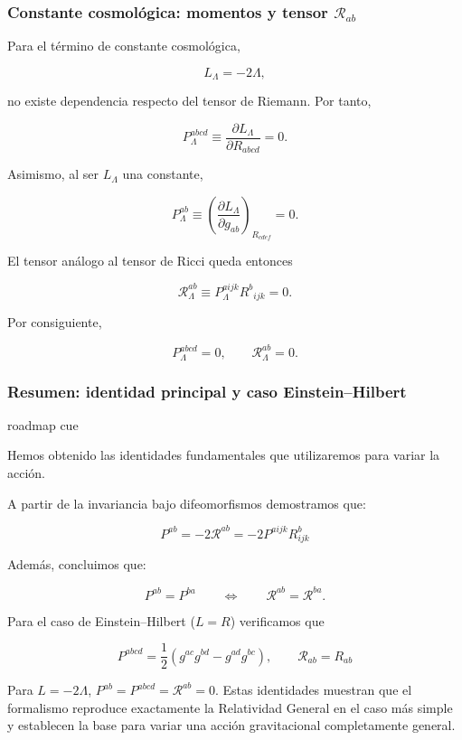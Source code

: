 \documentclass{beamer}
\newcommand{\CompactDisplaySpacing}{%
  \setlength{\abovedisplayskip}{2pt plus 1pt minus 1pt}%
  \setlength{\belowdisplayskip}{2pt plus 1pt minus 1pt}%
  \setlength{\abovedisplayshortskip}{0pt plus 1pt}%
  \setlength{\belowdisplayshortskip}{1pt plus 1pt}%
}
\newcommand{\RoadmapCue}[1]{%
    \begin{beamercolorbox}[
        wd=\textwidth,
        sep=.55ex,
        leftskip=.8ex,
        rounded=true
    ]{roadmap cue}

    \scriptsize
    \enspace #1

    \end{beamercolorbox}

    \vspace{.25em}
}
\begin{document}
\begin{frame}[label=nav-frame-021]
\frametitle{Constante cosmológica: momentos y tensor $\mathcal{R}_{ab}$}
\small
\linespread{.96}\selectfont\CompactDisplaySpacing

Para el término de constante cosmológica,

\[
L_{\Lambda}=-2\Lambda,
\]

no existe dependencia respecto del tensor de Riemann. Por tanto,

\[
P_{\Lambda}^{abcd}
\equiv
\frac{\partial L_{\Lambda}}{\partial R_{abcd}}
=0.
\]

Asimismo, al ser \(L_{\Lambda}\) una constante,

\[
P_{\Lambda}^{ab}
\equiv
\left(
\frac{\partial L_{\Lambda}}{\partial g_{ab}}
\right)_{R_{cdef}}
=0.
\]

El tensor análogo al tensor de Ricci queda entonces

\[
\mathcal{R}_{\Lambda}^{ab}
\equiv
P_{\Lambda}^{aijk}R^{b}{}_{ijk}
=0.
\]

Por consiguiente,

\[
\boxed{
P_{\Lambda}^{abcd}=0,
\qquad
\mathcal{R}_{\Lambda}^{ab}=0
}.
\]

\end{frame}







\begin{frame}[label=nav-frame-023]
\frametitle{Resumen: identidad principal y caso Einstein--Hilbert}

\RoadmapCue{
Hemos obtenido las identidades fundamentales que utilizaremos
para variar la acción.
}

\small

A partir de la invariancia bajo difeomorfismos demostramos que:

\[
P^{ab}=-2\mathcal R^{ab} = -2P^{aijk}R^{b}_{ijk}
\]

\vspace{0.2cm}

Además, concluimos que:

\[
P^{ab}=P^{ba}
\qquad\Longleftrightarrow\qquad
\mathcal R^{ab}=\mathcal R^{ba}.
\]

\vspace{0.2cm}

Para el caso de Einstein--Hilbert (\(L=R\)) verificamos que

\[
P^{abcd}
=
\frac12
\left(
g^{ac}g^{bd} - g^{ad}g^{bc}
\right),
\qquad
\mathcal R_{ab}=R_{ab}
\]

Para $L=-2\Lambda$, $P^{ab}=P^{abcd}=\mathcal R^{ab}=0$. Estas identidades muestran que el formalismo reproduce exactamente la Relatividad General en el caso más simple y establecen la base para variar una acción gravitacional completamente general.

\end{frame}
\end{document}
